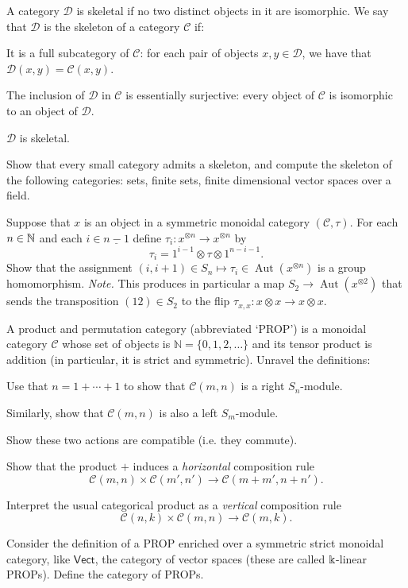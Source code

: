 \begin{question}\label{ex:skeleton}
A category $\mathcal D$ is skeletal if no two distinct
objects in it are isomorphic. We say that $\mathcal{D}$ is
the skeleton of a category $\mathcal{C}$ if:
\begin{tenumerate}
\item It is a full subcategory of $\mathcal{C}$: for each
pair of objects $x,y\in\mathcal{D}$, we have that 
$\mathcal{D}(x,y) = \mathcal{C}(x,y)$.
\item The inclusion of $\mathcal{D}$ in $\mathcal{C}$ is
essentially surjective: every object of $\mathcal{C}$ is
isomorphic to an object of $\mathcal{D}$.
\item $\mathcal{D}$ is skeletal.
\end{tenumerate}
Show that every small category admits a skeleton, and
compute the skeleton of the following categories: sets,
finite sets, finite dimensional vector spaces over
a field.
\end{question}
\medskip

\begin{question}
Suppose that $x$ is an object in a symmetric monoidal
category $(\mathcal{C},\tau)$. For each $n\in\mathbb N$ and 
each $i\in \underline{n-1}$ define $\tau_i : x^{\otimes n} 
\longrightarrow x^{\otimes n}$ by
\[ \tau_i = 1^{i-1} \otimes \tau \otimes 1^{n-i-1}.\]
Show that the assignment
$(i,i+1)\in S_n\longmapsto \tau_i
	 \in\operatorname{Aut}( x^{\otimes n})$ 
	 is a group homomorphism. \emph{Note.} This
	 produces in particular a map $S_2\longrightarrow 
	 \operatorname{Aut}(x^{\otimes 2})$ that sends
	 the transposition $(12)\in S_2$ to the
	 flip $\tau_{x,x}:x\otimes x\longrightarrow 
	 x\otimes x$.  
\end{question}

\begin{question} A product and permutation category (abbreviated `PROP')
is a monoidal category $\mathcal{C}$ whose set of objects is $\mathbb N = 
\{0,1,2,\ldots\}$ and its tensor product is addition (in particular, 
it is strict and symmetric). Unravel the definitions:
\begin{tenumerate}
\item Use that $n = 1+\cdots + 1$ to show that $\mathcal{C}(m,n)$ is a right $S_n$-module.
\item Similarly, show that $\mathcal{C}(m,n)$ is also a left $S_m$-module.
\item Show these two actions are compatible (i.e. they commute).
\item Show that the product $+$ induces a \emph{horizontal} composition rule 
\[ \mathcal{C}(m,n) \times \mathcal{C}(m',n') 	\longrightarrow
 	\mathcal{C}(m+m',n+n'). \]
\item Interpret the usual categorical product as a \emph{vertical} composition rule 
\[ \mathcal{C}(n,k) \times \mathcal{C}(m,n) 	\longrightarrow
 	\mathcal{C}(m,k). \]
\end{tenumerate}
Consider the definition of a PROP enriched over a symmetric strict 
monoidal category, like $\mathsf{Vect}$, the category of vector spaces 
(these are called $\Bbbk$-linear PROPs). Define the category of PROPs. 
\end{question}

